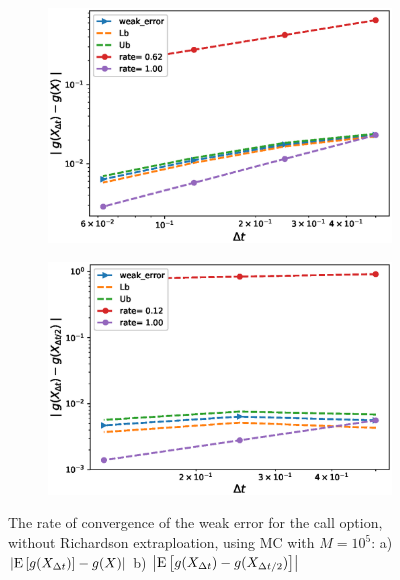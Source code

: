 \documentclass[11pt]{article}
\newcommand{\expt}[1]{\mathrm{E}\left[#1\right]}
\begin{document}
\begin{figure}[h!]
	\centering
	\begin{subfigure}{.4\textwidth}
		\centering
		\includegraphics[width=1\linewidth]{./figures/weak_error_rates_call/Beta_10/without_richardson/weak_convergence_order_call_option_relative_M_10_5}
		\caption{}
		\label{fig:sub3}
	\end{subfigure}%
	\begin{subfigure}{.4\textwidth}
		\centering
		\includegraphics[width=1\linewidth]{./figures/weak_error_rates_call/Beta_10/without_richardson/weak_convergence_order_differences_call_option_relative_M_10_5}
		\caption{}
		\label{fig:sub4}
	\end{subfigure}
	
	\caption{The rate of convergence of the weak error for the call option, without Richardson extraploation, using MC with $M=10^5$: a) $\abs{\expt{g(X_{\Delta t})}-g(X)}$  b) $\abs{\expt{g(X_{\Delta t})-g(X_{\Delta t/2})}}$ }
	\label{fig:Weak_rate_call_without_rich}
\end{figure}
\end{document}
